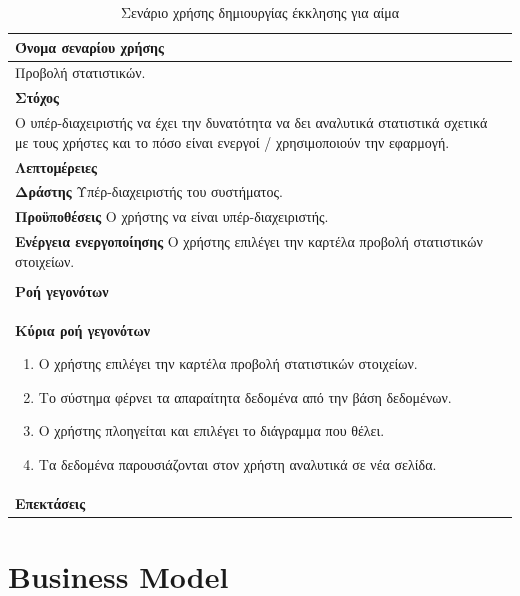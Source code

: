 \begin{table}[H]
	\begin{center}
	    \begin{tabular}{|p{\dimexpr \linewidth-2\tabcolsep}|}
	    \hline
	    \rowcolor{grayy}
	    \textbf{Όνομα σεναρίου χρήσης}
	    \\ \hline    
	    Προβολή στατιστικών.
	     \\ \hline
	    \rowcolor{grayy}
	    \textbf{\textbf{Στόχος}}
	    \\ \hline
	 	 Ο υπέρ-διαχειριστής να έχει την δυνατότητα να δει αναλυτικά στατιστικά σχετικά με τους χρήστες και το πόσο είναι ενεργοί / χρησιμοποιούν την εφαρμογή. 
	    \\ \hline
	    \rowcolor{grayy}
	    \textbf{Λεπτομέρειες}
	    \\ \hline
		\textbf{Δράστης} Υπέρ-διαχειριστής του συστήματος.
		\\*
		\textbf{Προϋποθέσεις} Ο χρήστης να είναι υπέρ-διαχειριστής.
		\\*
		\textbf{Ενέργεια ενεργοποίησης} Ο χρήστης επιλέγει την καρτέλα προβολή στατιστικών στοιχείων.
		\\ \hline
	    \\ \hline
		\rowcolor{grayy}    
	    \textbf{Ροή γεγονότων}
	    \\* 
		\textbf{Κύρια ροή γεγονότων}
		\begin{enumerate}
		\item	 Ο χρήστης επιλέγει την καρτέλα προβολή στατιστικών στοιχείων.
		\item Το σύστημα φέρνει τα απαραίτητα δεδομένα από την βάση δεδομένων.
		\item Ο χρήστης πλοηγείται και επιλέγει το διάγραμμα που θέλει.
		\item Τα δεδομένα παρουσιάζονται στον χρήστη αναλυτικά  σε νέα σελίδα.
		\end{enumerate}
		\\*
		\textbf{Επεκτάσεις}
		   \\ \hline
	    \end{tabular}
	    \caption{Σενάριο χρήσης δημιουργίας έκκλησης για αίμα}
	    \label{tab:view_analytics} 
	\end{center}
\end{table}


\section{Business Model}
